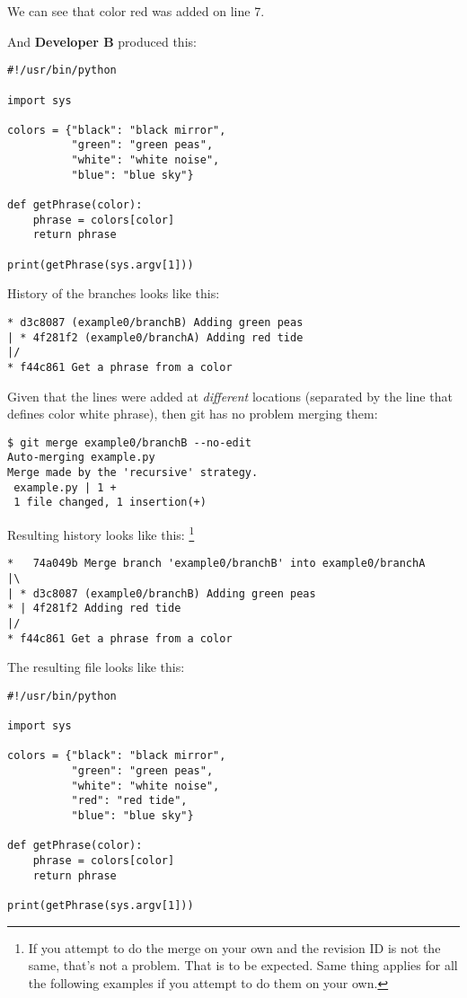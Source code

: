 We can see that color red was added on line 7.

And {\bf Developer B} produced this:
\begin{lstlisting}[style=python_style]
#!/usr/bin/python

import sys

colors = {"black": "black mirror",
          "green": "green peas",
          "white": "white noise",
          "blue": "blue sky"}

def getPhrase(color):
    phrase = colors[color]
    return phrase

print(getPhrase(sys.argv[1]))
\end{lstlisting}

History of the branches looks like this:
\begin{lstlisting}[style=branch_history_style]
* d3c8087 (example0/branchB) Adding green peas
| * 4f281f2 (example0/branchA) Adding red tide
|/  
* f44c861 Get a phrase from a color
\end{lstlisting}

Given that the lines were added at {\it different} locations (separated by the line that defines color white phrase), then git has
no problem merging them:

\begin{lstlisting}[style=console_style]
$ git merge example0/branchB --no-edit
Auto-merging example.py
Merge made by the 'recursive' strategy.
 example.py | 1 +
 1 file changed, 1 insertion(+)
\end{lstlisting}

Resulting history looks like this: \footnote{If you attempt to do the merge on your own and the revision ID is not the same,
that's not a problem. That is to be expected. Same thing applies for all the following examples if you attempt to do them on your own.}
\begin{lstlisting}[style=branch_history_style]
*   74a049b Merge branch 'example0/branchB' into example0/branchA
|\  
| * d3c8087 (example0/branchB) Adding green peas
* | 4f281f2 Adding red tide
|/  
* f44c861 Get a phrase from a color
\end{lstlisting}

The resulting file looks like this:
\begin{lstlisting}[style=python_style]
#!/usr/bin/python

import sys

colors = {"black": "black mirror",
          "green": "green peas",
          "white": "white noise",
          "red": "red tide",
          "blue": "blue sky"}

def getPhrase(color):
    phrase = colors[color]
    return phrase

print(getPhrase(sys.argv[1]))
\end{lstlisting}

